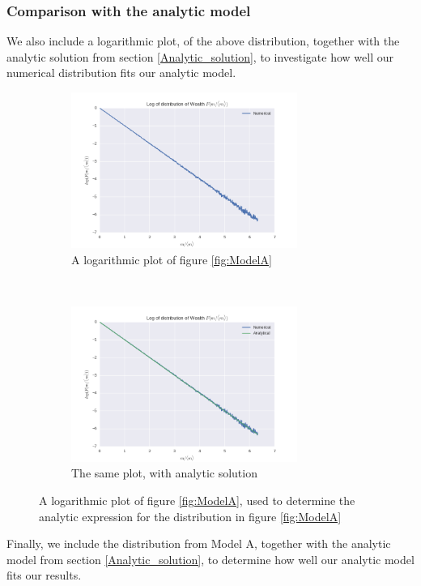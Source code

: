 \documentclass[a4paper, 10pt]{article}
\begin{document}
\subsubsection{Comparison with the analytic model}
We also include a logarithmic plot, of the above distribution, together with the analytic solution from section \ref{Analytic_solution}, to investigate how well our numerical distribution fits our analytic model.
\begin{figure}[!ht]
    \centering
    \begin{subfigure}[H!]{0.5\textwidth}
        \centering
        \includegraphics[height=2.0in]{logDistLamb0.png}
        \caption{A logarithmic plot of figure \ref{fig:ModelA}}\label{fig:ModelA_log_raw}
    \end{subfigure}%
    ~ 
    \begin{subfigure}[H!]{0.5\textwidth}
        \centering
        \includegraphics[height=2.0in]{logDistLamb0WAnalyt.png}
        \caption{The same plot, with analytic solution}\label{fig:ModelA_log_fit}
    \end{subfigure}
    \caption{A logarithmic plot of figure \ref{fig:ModelA}, used to determine the analytic expression for the distribution in figure \ref{fig:ModelA}}\label{fig:ModelA__log}
\end{figure}
\linebreak
Finally, we include the distribution from Model A, together with the analytic model from section \ref{Analytic_solution}, to determine how well our analytic model fits our results.
\end{document}
